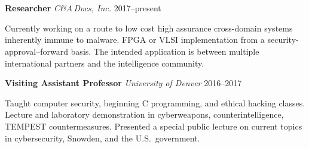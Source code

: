 \section*{}

\begin{comment}
\vspace{-10mm}
\emph{Technical programming, cybersecurity, certification and accreditation
of cross domain solutions and systems, cryptography, pentesting, security
research, writing and speaking. Specialist in understanding new government
computer security standards---especially when they're new or have
suddenly changed. Experienced in Common Criteria, DIACAP, NIST SP 800-53
and RMF, DCID 6/3, and DoD 8540.}
\end{comment}

\vspace{-10mm}
\begin{comment}
\noindent\textbf{Research Assistant Professor}
    \hfill\emph{University of Denver}\hfill 2017--present

    \vspace{1mm}
    \noindent Developing a transformational new method for high assurance cross-domain
    information transfer. FPGA implementation from a
    security-approval--forward basis. The intended application is
    between multiple international partners and intel community.
    Principal Investigator (PI) for the CCM project.

\vspace{3mm}
\end{comment}
\noindent\textbf{Researcher}
    \hfill\emph{C\&A\,Docs, Inc.} \hfill 2017--present

    \vspace{1mm}
    \noindent 
    Currently working on a route to low cost high assurance cross-domain systems
    inherently immune to malware. FPGA or VLSI implementation from a
    security-approval--forward basis. The intended application is between
    multiple international partners and the intelligence community.

\vspace{3mm}
\noindent\textbf{Visiting Assistant Professor}
    \hfill \emph{University of Denver} \hfill 2016--2017

    \vspace{1mm}
    \noindent Taught computer security, beginning C programming, and ethical hacking
    classes. Lecture and laboratory demonstration in cyberweapons,
    counterintelligence, TEMPEST countermeasures. Presented a special public lecture on
    current topics in cybersecurity, Snowden, and the U.S.\ government.

